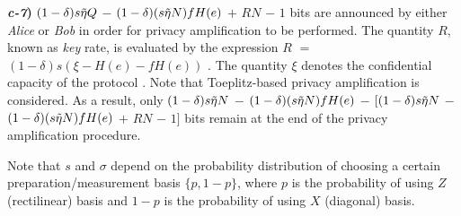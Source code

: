 \documentclass[journal,onecolumn]{IEEEtran}
\theoremstyle{thmstyleone}%
\theoremstyle{thmstyletwo}%
\theoremstyle{thmstylethree}%
\begin{document}
	\begin{tcolorbox}[colback=blue!5,colframe=blue!40!black,title=\textsc{Privacy amplification}]
		\textbf{\textit{c-7})} $(1-\delta)s\Tilde{\eta}Q$ $-$ $(1-\delta)(s\Tilde{\eta}N)fH(e)$ $+$ $RN$ $-$ $1$ bits are announced by either \textit{Alice} or \textit{Bob} in order for privacy amplification to be performed. The quantity $R$, known as \textit{key} rate, is evaluated by the expression $R$ $=$ $(1-\delta)s(\xi - H(e) - fH(e))$ \cite{Gottesman}. The quantity $\xi$ denotes the confidential capacity of the protocol \cite{Bebrov2024}. Note that Toeplitz-based privacy amplification is considered. As a result, only $(1-\delta)s\Tilde{\eta}N$ $-$ $(1-\delta)(s\Tilde{\eta}N)fH(e)$ $-$ $[(1-\delta)s\Tilde{\eta}N$ $-$ $(1-\delta)(s\Tilde{\eta}N)fH(e)$ $+$ $RN$ $-$ $1]$ bits remain at the end of the privacy amplification procedure.
	\end{tcolorbox}
	
	Note that $s$ and $\sigma$ depend on the probability distribution of choosing a certain preparation/measurement basis $\{p,1-p\}$, where $p$ is the probability of using $Z$ (rectilinear) basis and $1-p$ is the probability of using $X$ (diagonal) basis.
	
\end{document}
